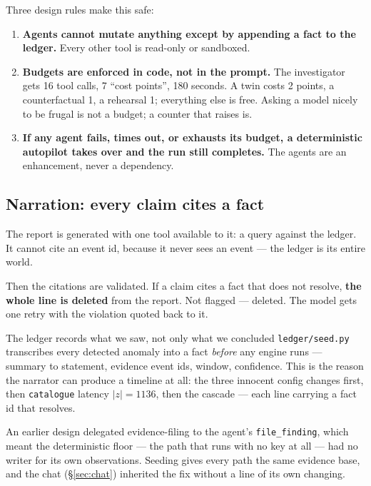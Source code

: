\documentclass[11pt,a4paper]{article}
\newcommand{\code}[1]{\texttt{\small #1}}
\begin{document}
Three design rules make this safe:

\begin{enumerate}[leftmargin=1.6em]
  \item \textbf{Agents cannot mutate anything except by appending a fact to the
  ledger.} Every other tool is read-only or sandboxed.
  \item \textbf{Budgets are enforced in code, not in the prompt.} The investigator
  gets 16 tool calls, 7 ``cost points'', 180 seconds. A twin costs 2 points, a
  counterfactual 1, a rehearsal 1; everything else is free. Asking a model nicely
  to be frugal is not a budget; a counter that raises is.
  \item \textbf{If any agent fails, times out, or exhausts its budget, a
  deterministic autopilot takes over and the run still completes.} The agents are
  an enhancement, never a dependency.
\end{enumerate}

\subsection{Narration: every claim cites a fact}

The report is generated with one tool available to it: a query against the
ledger. It cannot cite an event id, because it never sees an event --- the ledger
is its entire world.

Then the citations are validated. If a claim cites a fact that does not resolve,
\textbf{the whole line is deleted} from the report. Not flagged --- deleted. The
model gets one retry with the violation quoted back to it.

\begin{keybox}{The ledger records what we saw, not only what we concluded}
\code{ledger/seed.py} transcribes every detected anomaly into a fact
\emph{before} any engine runs --- summary to statement, evidence event ids,
window, confidence. This is the reason the narrator can produce a timeline at
all: the three innocent config changes first, then \code{catalogue} latency
$|z| = 1136$, then the cascade --- each line carrying a fact id that resolves.

An earlier design delegated evidence-filing to the agent's \code{file\_finding},
which meant the deterministic floor --- the path that runs with no key at all ---
had no writer for its own observations. Seeding gives every path the same
evidence base, and the chat (\S\ref{sec:chat}) inherited the fix without a line
of its own changing.
\end{keybox}
\end{document}
